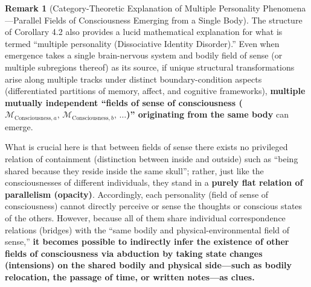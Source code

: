 \documentclass[11pt,a4paper]{article}
\theoremstyle{definition}
\newtheorem{remark}{Remark}[section]
\theoremstyle{plain}
\begin{document}
\begin{remark}[Category-Theoretic Explanation of Multiple Personality Phenomena---Parallel Fields of Consciousness Emerging from a Single Body]
The structure of Corollary 4.2 also provides a lucid mathematical explanation for what is termed ``multiple personality (Dissociative Identity Disorder).'' Even when emergence takes a single brain-nervous system and bodily field of sense (or multiple subregions thereof) as its source, if unique structural transformations arise along multiple tracks under distinct boundary-condition aspects (differentiated partitions of memory, affect, and cognitive frameworks), \textbf{multiple mutually independent ``fields of sense of consciousness ($\mathcal{M}_{\mathrm{Consciousness}, a},\, \mathcal{M}_{\mathrm{Consciousness}, b},\, \dots$)'' originating from the same body} can emerge.

What is crucial here is that between fields of sense there exists no privileged relation of containment (distinction between inside and outside) such as ``being shared because they reside inside the same skull''; rather, just like the consciousnesses of different individuals, they stand in a \textbf{purely flat relation of parallelism (opacity)}. Accordingly, each personality (field of sense of consciousness) cannot directly perceive or sense the thoughts or conscious states of the others. However, because all of them share individual correspondence relations (bridges) with the ``same bodily and physical-environmental field of sense,'' \textbf{it becomes possible to indirectly infer the existence of other fields of consciousness via abduction by taking state changes (intensions) on the shared bodily and physical side---such as bodily relocation, the passage of time, or written notes---as clues.}
\end{remark}
\end{document}
